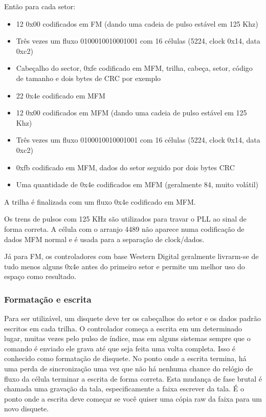 \documentclass[letterpaper,10pt,brazil]{sphinxmanual}
\begin{document}
Então para cada setor:
\begin{itemize}
\item {} 
12 0x00 codificados em FM (dando uma cadeia de pulso estável em
125 Khz)

\item {} 
Três vezes um fluxo 0100010010001001 com 16 células (5224, clock 0x14,
data 0xc2)

\item {} 
Cabeçalho do sector, 0xfe codificado em MFM, trilha, cabeça, setor,
código de tamanho e dois bytes de CRC por exemplo

\item {} 
22 0x4e codificado em MFM

\item {} 
12 0x00 codificados em MFM (dando uma cadeia de pulso estável em
125 Khz)

\item {} 
Três vezes um fluxo 0100010010001001 com 16 células (5224, clock 0x14,
data 0xc2)

\item {} 
0xfb codificado em MFM, dados do setor seguido por dois bytes CRC

\item {} 
Uma quantidade de 0x4e codificados em MFM (geralmente 84, muito
volátil)

\end{itemize}

A trilha é finalizada com um fluxo 0x4e codificado em MFM.

Os trens de pulsos com 125 KHz são utilizados para travar o PLL ao
sinal de forma correta. A célula com o arranjo 4489 não aparece numa
codificação de dados MFM normal e é usada para a separação de
clock/dados.

Já para FM, os controladores com base Western Digital geralmente
livrarm-se de tudo menos alguns 0x4e antes do primeiro setor e permite
um melhor uso do espaço como resultado.


\subsubsection{Formatação e escrita}
\label{techspecs/floppy:formatacao-e-escrita}
Para ser utilizável, um disquete deve ter os cabeçalhos do setor e os
dados padrão escritos em cada trilha. O controlador começa a escrita em
um determinado lugar, muitas vezes pelo pulso de índice, mas em alguns
sistemas sempre que o comando é enviado ele grava até que seja feita uma
volta completa. Isso é conhecido como formatação de disquete. No ponto
onde a escrita termina, há uma perda de sincronização uma vez que não
há nenhuma chance do relógio de fluxo da célula terminar a escrita de
forma correta. Esta mudança de fase brutal é chamada uma gravação da
tala, especificamente a faixa escrever da tala. É o ponto onde a
escrita deve começar se você quiser uma cópia raw da faixa para um novo
disquete.
\end{document}
